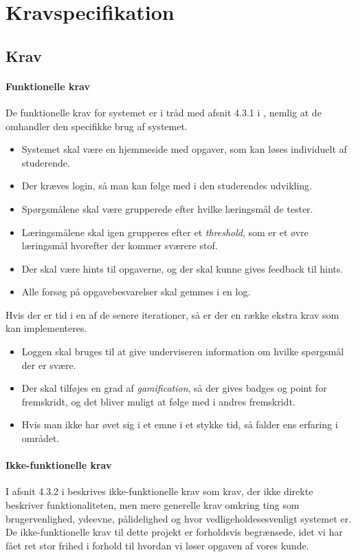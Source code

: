 \documentclass[12pt]{article}
\begin{document}
\section{Kravspecifikation}
\label{sec:kravspecifikation}

\subsection{Krav}
\label{sub:krav}
\paragraph{Funktionelle krav}
De funktionelle krav for systemet er i tråd med afsnit 4.3.1 i \cite{OOSE}, nemlig at de omhandler den specifikke brug af systemet.
\begin{itemize}
    \item Systemet skal være en hjemmeside med opgaver, som kan løses individuelt af studerende.
    \item Der kræves login, så man kan følge med i den studerendes udvikling.
    \item Spørgsmålene skal være grupperede efter hvilke læringsmål de tester.
    \item Læringsmålene skal igen grupperes efter et \emph{threshold}, som er et øvre læringsmål hvorefter der kommer sværere stof.
    \item Der skal være hints til opgaverne, og der skal kunne gives feedback til hints.
    \item Alle forsøg på opgavebesvarelser skal gemmes i en log.
\end{itemize}
Hvis der er tid i en af de senere iterationer, så er der en række ekstra krav som kan implementeres.
\begin{itemize}
    \item Loggen skal bruges til at give underviseren information om hvilke spørgsmål der er svære.
    \item Der skal tilføjes en grad af \emph{gamification}, så der gives badges og point for fremskridt, og det bliver muligt at følge med i andres fremskridt.
    \item Hvis man ikke har øvet sig i et emne i et stykke tid, så falder ens erfaring i området.
\end{itemize}

\paragraph{Ikke-funktionelle krav}
\label{par:ikke_funktionelle_krav}
I afsnit 4.3.2 i \cite{OOSE} beskrives ikke-funktionelle krav som krav, der ikke direkte beskriver funktionaliteten, men mere generelle krav omkring ting som brugervenlighed, ydeevne, pålidelighed og hvor vedligeholdesesvenligt systemet er. De ikke-funktionelle krav til dette projekt er forholdsvis begrænsede, idet vi har fået ret stor frihed i forhold til hvordan vi løser opgaven af vores kunde.
\end{document}
